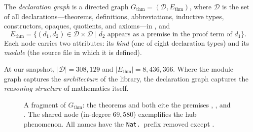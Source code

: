 \begin{definition}
\label{def:thm-graph}
The \emph{declaration graph} is a directed graph $G_{\mathrm{thm}} = (\mathcal{D}, E_{\mathrm{thm}})$, where $\mathcal{D}$ is the set of all declarations---theorems, definitions, abbreviations, inductive types, constructors, opaques, quotients, and axioms---in , and
\[
  E_{\mathrm{thm}} = \{(d_1, d_2) \in \mathcal{D} \times \mathcal{D} \mid d_2 \text{ appears as a premise in the proof term of } d_1\}.
\]
Each node carries two attributes: its \emph{kind} (one of eight declaration types) and its \emph{module} (the source file in which it is defined).
\end{definition}

\noindent At our snapshot, $|\mathcal{D}| = 308{,}129$ and $|E_{\mathrm{thm}}| = 8{,}436{,}366$. Where the module graph captures the \emph{architecture} of the library, the declaration graph captures the \emph{reasoning structure} of mathematics itself.

\begin{figure}[H]
\centering
{}
\caption{A fragment of $G_{\mathrm{thm}}$: the theorems  and  both cite the premises , , and . The shared node  (in-degree $69{,}580$) exemplifies the hub phenomenon. All names have the \texttt{Nat.}\ prefix removed except .}
\label{fig:thm-fragment}
\end{figure}

